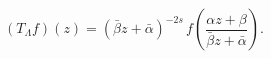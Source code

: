 \begin{equation}
(T_{\Lambda}f)(z)=(\bar{\beta} z+\bar{\alpha})^{-2s}\,
f\left(\frac{\alpha z+\beta}{\bar{\beta} z+\bar{\alpha}}\right).
\label{trans}
\end{equation}

